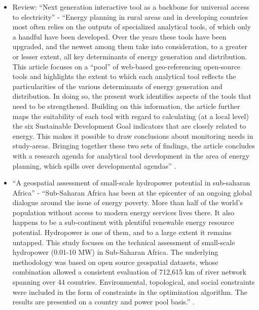 \documentclass[conference, a4paper]{IEEEtran}
\begin{document}
\begin{itemize}
\item Review: ``Next generation interactive tool as a backbone for universal access to electricity'' - ``Energy planning in rural areas and in developing countries most often relies on the outputs of specialized analytical tools, of which only a handful have been developed. Over the years these tools have been upgraded, and the newest among them take into consideration, to a greater or lesser extent, all key determinants of energy generation and distribution. This article focuses on a “pool” of web-based geo-referencing open-source tools and highlights the extent to which each analytical tool reflects the particularities of the various determinants of energy generation and distribution. In doing so, the present work identifies aspects of the tools that need to be strengthened. Building on this information, the article further maps the suitability of each tool with regard to calculating (at a local level) the six Sustainable Development Goal indicators that are closely related to energy. This makes it possible to draw conclusions about monitoring needs in study-areas. Bringing together these two sets of findings, the article concludes with a research agenda for analytical tool development in the area of energy planning, which spills over developmental agendas'' \cite{moner-girona-puig-ea-2018}.
  
\item ``A geospatial assessment of small-scale hydropower potential in sub-saharan Africa'' - ``Sub-Saharan Africa has been at the epicenter of an ongoing global dialogue around the issue of energy poverty. More than half of the world's population without access to modern energy services lives there. It also happens to be a sub-continent with plentiful renewable energy resource potential. Hydropower is one of them, and to a large extent it remains untapped. This study focuses on the technical assessment of small-scale hydropower (0.01-10 MW) in Sub-Saharan Africa. The underlying methodology was based on open source geospatial datasets, whose combination allowed a consistent evaluation of 712,615 km of river network spanning over 44 countries. Environmental, topological, and social constraints were included in the form of constraints in the optimization algorithm. The results are presented on a country and power pool basis.'' \cite{korkovelos-mentis-ea-2018}.


\end{itemize}
\end{document}

